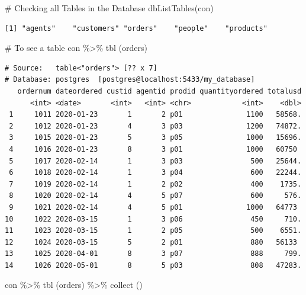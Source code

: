\documentclass[
  letterpaper,
  DIV=11,
  numbers=noendperiod]{scrreprt}
\newenvironment{Shaded}{\begin{snugshade}}{\end{snugshade}}
\newcommand{\CommentTok}[1]{\textcolor[rgb]{0.37,0.37,0.37}{#1}}
\newcommand{\FunctionTok}[1]{\textcolor[rgb]{0.28,0.35,0.67}{#1}}
\newcommand{\NormalTok}[1]{\textcolor[rgb]{0.00,0.23,0.31}{#1}}
\newcommand{\SpecialCharTok}[1]{\textcolor[rgb]{0.37,0.37,0.37}{#1}}
\newcommand{\StringTok}[1]{\textcolor[rgb]{0.13,0.47,0.30}{#1}}
\begin{document}
\begin{Shaded}
\begin{Highlighting}[]
\CommentTok{\# Checking all Tables in the Database }
\FunctionTok{dbListTables}\NormalTok{(con)}
\end{Highlighting}
\end{Shaded}

\begin{verbatim}
[1] "agents"    "customers" "orders"    "people"    "products" 
\end{verbatim}

\begin{Shaded}
\begin{Highlighting}[]
\CommentTok{\# To see a table }
\NormalTok{con }\SpecialCharTok{\%\textgreater{}\%}
  \FunctionTok{tbl}\NormalTok{ (}\StringTok{\textquotesingle{}orders\textquotesingle{}}\NormalTok{) }
\end{Highlighting}
\end{Shaded}

\begin{verbatim}
# Source:   table<"orders"> [?? x 7]
# Database: postgres  [postgres@localhost:5433/my_database]
   ordernum dateordered custid agentid prodid quantityordered totalusd
      <int> <date>       <int>   <int> <chr>            <int>    <dbl>
 1     1011 2020-01-23       1       2 p01               1100   58568.
 2     1012 2020-01-23       4       3 p03               1200   74872.
 3     1015 2020-01-23       5       3 p05               1000   15696.
 4     1016 2020-01-23       8       3 p01               1000   60750 
 5     1017 2020-02-14       1       3 p03                500   25644.
 6     1018 2020-02-14       1       3 p04                600   22244.
 7     1019 2020-02-14       1       2 p02                400    1735.
 8     1020 2020-02-14       4       5 p07                600     576.
 9     1021 2020-02-14       4       5 p01               1000   64773 
10     1022 2020-03-15       1       3 p06                450     710.
11     1023 2020-03-15       1       2 p05                500    6551.
12     1024 2020-03-15       5       2 p01                880   56133 
13     1025 2020-04-01       8       3 p07                888     799.
14     1026 2020-05-01       8       5 p03                808   47283.
\end{verbatim}

\begin{Shaded}
\begin{Highlighting}[]
\NormalTok{con }\SpecialCharTok{\%\textgreater{}\%}
  \FunctionTok{tbl}\NormalTok{ (}\StringTok{\textquotesingle{}orders\textquotesingle{}}\NormalTok{) }\SpecialCharTok{\%\textgreater{}\%}
  \FunctionTok{collect}\NormalTok{ ()}
\end{Highlighting}
\end{Shaded}
\end{document}
